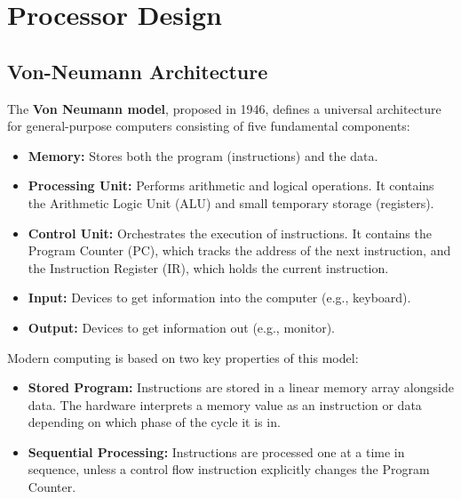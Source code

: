 \section{Processor Design}

\subsection{Von-Neumann Architecture}

\begin{definition}
	The \textbf{Von Neumann model}, proposed in 1946, defines a universal architecture for general-purpose computers consisting of five fundamental components:
	\begin{itemize}
		\item \textbf{Memory:} Stores both the program (instructions) and the data.
		\item \textbf{Processing Unit:} Performs arithmetic and logical operations. It contains the Arithmetic Logic Unit (ALU) and small temporary storage (registers).
		\item \textbf{Control Unit:} Orchestrates the execution of instructions. It contains the Program Counter (PC), which tracks the address of the next instruction, and the Instruction Register (IR), which holds the current instruction.
		\item \textbf{Input:} Devices to get information into the computer (e.g., keyboard).
		\item \textbf{Output:} Devices to get information out (e.g., monitor).
	\end{itemize}
\end{definition}

\begin{important}
	Modern computing is based on two key properties of this model:
	\begin{itemize}
		\item \textbf{Stored Program:} Instructions are stored in a linear memory array alongside data. The hardware interprets a memory value as an instruction or data depending on which phase of the cycle it is in.
		\item \textbf{Sequential Processing:} Instructions are processed one at a time in sequence, unless a control flow instruction explicitly changes the Program Counter.
	\end{itemize}
\end{important}


